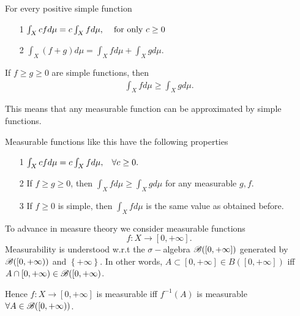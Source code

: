 \begin{properties}
    For every positive simple function
    \begin{center}
\begin{itemize}
    \item[1] $\int_X cfd\mu = c\int_Xfd\mu,\hspace{4mm}\text{for only } c\geq 0$
    \item[2] $\int_X(f+g)d\mu = \int_Xfd\mu + \int_X gd\mu$.
\end{itemize}
\end{center}
\end{properties}

\begin{corollary}
    If $f\geq g\geq 0$ are simple functions, then 
    \begin{align*}
        \int_X fd\mu \geq \int_X g d\mu.
    \end{align*}
\end{corollary}

\begin{remark}
    This means that any measurable function can be approximated by simple functions.
\end{remark}

\begin{properties}
    Measurable functions like this have the following properties 
    \begin{itemize}
        \item[1] $\int_X cfd\mu = c\int_X fd\mu,\hspace{3mm} \forall c\geq 0. $
        \item[2] If $f\geq g\geq 0$, then $\int_X fd\mu\geq\int_X gd\mu$ for any measurable $g,f$.
        \item[3] If $f\geq 0$ is simple, then $\int_X fd\mu $ is the same value as obtained before.    
    \end{itemize}
\end{properties}

To advance in measure theory we consider measurable functions $$f:X\rightarrow [0,+\infty].$$ Measurability is understood w.r.t the $\sigma-$algebra
 $\mathscr{B}([0,+\infty])$ generated by $\mathscr{B}(\left[0,+\infty\right))$ and $\left\{+\infty\right\}$. In other words, $A\subset[0,+\infty]\in B([0,+\infty])$ iff $A\cap [0,+\infty)\in \mathscr{B}([0,+\infty)$.
\begin{remark}
    Hence $f:X\rightarrow [0,+\infty]$ is measurable iff $f^{-1}(A)$ is measurable $\forall A\in \mathscr{B}([0,+\infty))$.
\end{remark}

